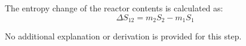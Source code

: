 The entropy change of the reactor contents is calculated as:  
\[
\Delta S_{12} = m_2 S_2 - m_1 S_1
\]  

No additional explanation or derivation is provided for this step.